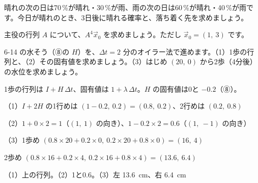 \begingroup{}%
\noindent\begin{minipage}[t]{0.49\linewidth}
\begin{jibun}
\raggedright 晴れの次の日は70\,\%が晴れ・30\,\%が雨、雨の次の日は60\,\%が晴れ・40\,\%が雨です。今日が晴れのとき、3日後に晴れる確率と、落ち着く先を求めましょう。
\end{jibun}
\end{minipage}\hfill
\begin{minipage}[t]{0.49\linewidth}
\begin{jibun}
\raggedright 主役の行列 $A$ について、$A^4\vec x_0$ を求めましょう。ただし $\vec x_0=(1,\ 3)$ です。
\end{jibun}
\end{minipage}\par
\endgroup

\begin{reidai}[水そうのオイラー法を行列で]
6-14 の水そう（⑧の $H$）を、$\Delta t=2$ 分のオイラー法で進めます。（1）1歩の行列と、（2）その固有値を求めましょう。（3）はじめ $(20,\ 0)$ から2歩（4分後）の水位を求めましょう。\par
\kangaekata 1歩の行列は $I+H\,\Delta t$、固有値は $1+\lambda\,\Delta t$。$H$ の固有値は0と $-0.2$（⑧）。\par
\shiki（1）$I+2H$ の1行めは $(1-0.2,\ 0.2)=(0.8,\ 0.2)$、2行めは $(0.2,\ 0.8)$\par
\kviikq（2）$1+0\times2=1$（$(1,\ 1)$ の向き）、$1-0.2\times2=0.6$（$(1,\ -1)$ の向き）\par
\kviikq（3）1歩め $(0.8\times20+0.2\times0,\ 0.2\times20+0.8\times0)=(16,\ 4)$\par
\kviikq 2歩め $(0.8\times16+0.2\times4,\ 0.2\times16+0.8\times4)=(13.6,\ 6.4)$\par
\kotae（1）上の行列。（2）1と0.6。（3）左 \qty{13.6}{cm}、右 \qty{6.4}{cm}
\end{reidai}

